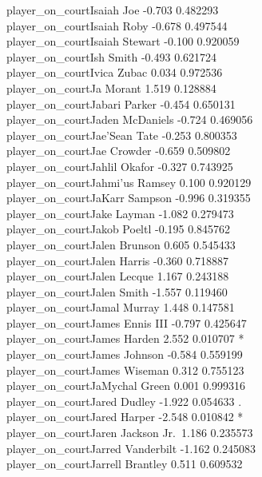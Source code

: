 \documentclass[
  landscape]{article}
\begin{document}
{{player\_on\_courtIsaiah Joe -0.703 0.482293\\
player\_on\_courtIsaiah Roby -0.678 0.497544\\
player\_on\_courtIsaiah Stewart -0.100 0.920059\\
player\_on\_courtIsh Smith -0.493 0.621724\\
player\_on\_courtIvica Zubac 0.034 0.972536\\
player\_on\_courtJa Morant 1.519 0.128884\\
player\_on\_courtJabari Parker -0.454 0.650131\\
player\_on\_courtJaden McDaniels -0.724 0.469056\\
player\_on\_courtJae'Sean Tate -0.253 0.800353\\
player\_on\_courtJae Crowder -0.659 0.509802\\
player\_on\_courtJahlil Okafor -0.327 0.743925\\
player\_on\_courtJahmi'us Ramsey 0.100 0.920129\\
player\_on\_courtJaKarr Sampson -0.996 0.319355\\
player\_on\_courtJake Layman -1.082 0.279473\\
player\_on\_courtJakob Poeltl -0.195 0.845762\\
player\_on\_courtJalen Brunson 0.605 0.545433\\
player\_on\_courtJalen Harris -0.360 0.718887\\
player\_on\_courtJalen Lecque 1.167 0.243188\\
player\_on\_courtJalen Smith -1.557 0.119460\\
player\_on\_courtJamal Murray 1.448 0.147581\\
player\_on\_courtJames Ennis III -0.797 0.425647\\
player\_on\_courtJames Harden 2.552 0.010707 *\\
player\_on\_courtJames Johnson -0.584 0.559199\\
player\_on\_courtJames Wiseman 0.312 0.755123\\
player\_on\_courtJaMychal Green 0.001 0.999316\\
player\_on\_courtJared Dudley -1.922 0.054633 .\\
player\_on\_courtJared Harper -2.548 0.010842 *\\
player\_on\_courtJaren Jackson Jr.~1.186 0.235573\\
player\_on\_courtJarred Vanderbilt -1.162 0.245083\\
player\_on\_courtJarrell Brantley 0.511 0.609532\\
}}
\end{document}
